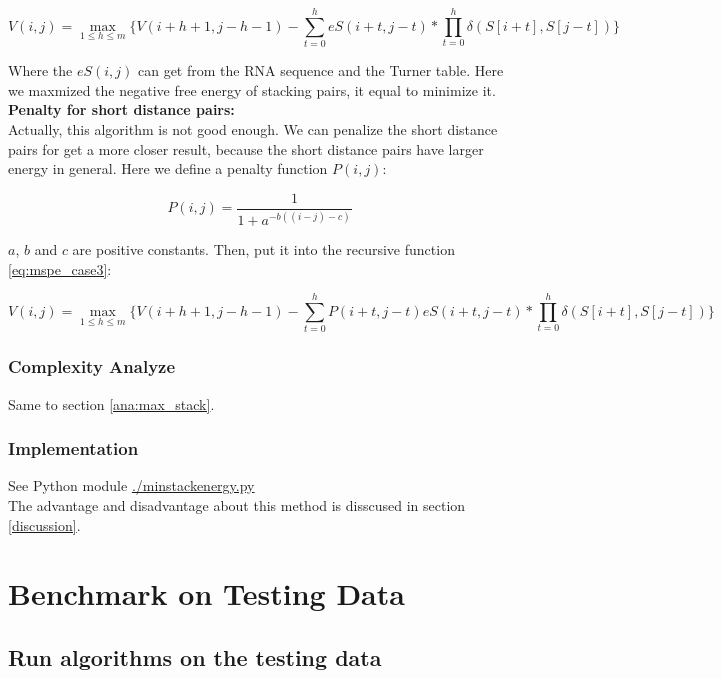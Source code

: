 \documentclass[10pt]{article}
\begin{document}
\begin{equation}
    \label{eq:mspe_case3}
    V(i,j) =\max_{1\leq h \leq m}{\{ V(i+h+1,j-h-1) - \sum_{t=0}^{h} eS(i+t, j-t) * \prod_{t=0}^{h} \delta(S[i+t], S[j-t]) \}}
\end{equation}

Where the $eS(i,j)$ can get from the RNA sequence and the Turner table.
Here we maxmized the negative free energy of stacking pairs, it equal to
minimize it. \\

\noindent
\textbf{Penalty for short distance pairs:}\\

Actually, this algorithm is not good enough.
We can penalize the short distance pairs for get a more closer result,
because the short distance pairs have larger energy in general.
Here we define a penalty function $P(i,j)$:

\[
    P(i,j) = \dfrac{1}{1+a^{-b((i-j)-c)}}
\]

$a$, $b$ and $c$ are positive constants. Then, put it into the recursive function \ref{eq:mspe_case3}:

\[
    V(i,j) =\max_{1\leq h \leq m}{\{ V(i+h+1,j-h-1) - \sum_{t=0}^{h} P(i+t,j-t)eS(i+t, j-t) * \prod_{t=0}^{h} \delta(S[i+t], S[j-t]) \}}
\]


\subsubsection{Complexity Analyze}

Same to section \ref{ana:max_stack}.

\subsubsection{Implementation}

See Python module \url{./minstackenergy.py} \\

\noindent
The advantage and disadvantage about this method is disscused in section \ref{discussion}.

\section{Benchmark on Testing Data}
\subsection{Run algorithms on the testing data}
\end{document}
